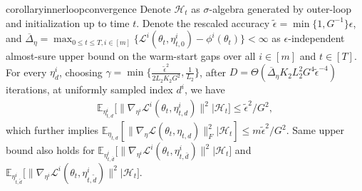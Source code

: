 \documentclass[twoside]{article} %
\theoremstyle{plain}
\theoremstyle{definition}
\theoremstyle{remark}
\newcommand{\tepsilon}{\tilde{\epsilon}}
\newcommand{\fL}{\mathcal{L}}
\newcommand{\calH}{\mathcal{H}}
\begin{document}
\begin{restatable}{corollary}{innerloopconvergence}
Denote $\calH_t$ as $\sigma$-algebra generated by outer-loop and initialization up to time $t$.
Denote the rescaled accuracy $\tepsilon = \min\{1,G^{-1}\}\epsilon$, and 
$\overline{\Delta}_{\eta}= \max_{0\leq t\leq T, i\in[m]}\big \{\fL^i({\theta}_t,\eta^i_{t,0})-\phi^i({\theta_t})\}<\infty$ as $\epsilon$-independent almost-sure upper bound on the warm-start gaps over all $i\in[m]$ and $t\in [T]$.
For every $\eta^i_{d}$, choosing $\gamma= \min\{\frac{\tepsilon^2}{2L_2K_2G^2},\frac{1}{L_2} \}$, 
after $D=\Theta(\overline{\Delta}_{\eta}K_2L_2^2G^4\tepsilon^{-4})$ iterations, at uniformly sampled index 
$d^i$, we have
\begin{align}
\mathbb{E}_{\eta^i_{t,d}}\big[\|\nabla_{\eta^i} \fL^i({\theta}_t, \eta^i_{t,d}) \|^2|\calH_t\big]\leq {\tepsilon^2/G^2},
\label{eq: inner loop stationary}
\end{align}
which further implies
$\mathbb{E}_{\eta_{t,d}}[\|\nabla_{\eta} \fL({\theta}_t, {\eta}_{t,{d}}) \|_F^2|\calH_t]\leq {m\tepsilon^2/{G^2}}$. Same upper bound also holds for $\mathbb{E}_{\eta^i_{t,\bar{d}}}\big[\|\nabla_{\eta^i} \fL^i({\theta}_t, \eta^i_{t,\bar{d}}) \|^2|\calH_t\big]$ and $\mathbb{E}_{\eta^i_{t,\tilde{d}}}\big[\|\nabla_{\eta^i} \fL^i({\theta}_t, \eta^i_{t,\tilde{d}}) \|^2|\calH_t\big]$.
\end{restatable}
\end{document}
